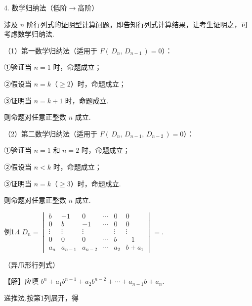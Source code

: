 \begin{fcard}{4. 数学归纳法（低阶$\to$高阶）}

涉及 $n$ 阶行列式的\underline{证明型计算问题}，即告知行列式计算结果，让考生证明之，可考虑数学归纳法.

（1）第一数学归纳法（适用于 $F(\,D_n,\,D_{n-1}\,)=0$）：

①验证当 $n=1$ 时，命题成立；

②假设当 $n=k$（$\ge2$）时，命题成立；

③证明当 $n=k+1$ 时，命题成立.

则命题对任意正整数 $n$ 成立.

（2）第二数学归纳法（适用于 $F(\,D_n,\,D_{n-1},\,D_{n-2}\,)=0$）：

①验证当 $n=1$ 和 $n=2$ 时，命题成立；

②假设当 $n<k$ 时，命题成立；

③证明当 $n=k$（$\ge3$）时，命题成立.

则命题对任意正整数 $n$ 成立.
\end{fcard}

\begin{fcard}{例1.4}
$D_n=\begin{vmatrix}b&-1&0&\cdots&0&0\\0&b&-1&\cdots&0&0\\\vdots&\vdots&\vdots&&\vdots&\vdots\\0&0&0&\cdots&b&-1\\a_n&a_{n-1}&a_{n-2}&\cdots&a_2&b+a_1\end{vmatrix}=$\underline{\hspace{2.6em}}.

（异爪形行列式）
\end{fcard}

【解】应填 $b^n+a_1b^{n-1}+a_2b^{n-2}+\cdots+a_{n-1}b+a_n$.

递推法.按第1列展开，得


